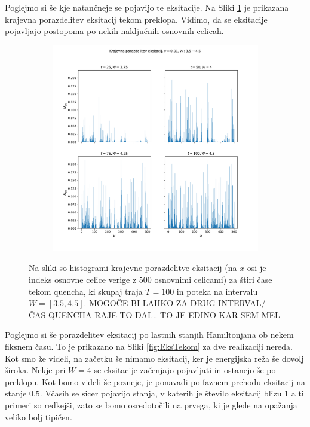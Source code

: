Poglejmo si še kje natančneje se pojavijo te eksitacije. Na Sliki \ref{fig:Krajevne} je prikazana krajevna porazdelitev eksitacij tekom preklopa. Vidimo, da se eksitacije pojavljajo postopoma po nekih naključnih osnovnih celicah.
\begin{figure}[H]
\centering
\begin{subfigure}{.99\textwidth}
\includegraphics[width=\linewidth]{Figures/KrajevneEksitacije.pdf}
\end{subfigure}
\caption{Na sliki so histogrami krajevne porazdelitve eksitacij (na $x$ osi je indeks osnovne celice verige z 500 osnovnimi celicami) za štiri čase tekom quencha, ki skupaj traja $T=100$ in poteka na intervalu $W=[3.5,4.5]$. MOGOČE BI LAHKO ZA DRUG INTERVAL/ČAS QUENCHA RAJE TO DAL.. TO JE EDINO KAR SEM MEL}
\label{fig:Krajevne}
\end{figure}

Poglejmo si še porazdelitev eksitacij po lastnih stanjih Hamiltonjana ob nekem fiksnem času. To je prikazano na Sliki \ref{fig:EksTekom} za dve realizaciji nereda. Kot smo že videli, na začetku še nimamo eksitacij, ker je energijska reža še dovolj široka. Nekje pri $W=4$ se eksitacije začenjajo pojavljati in ostanejo še po preklopu. 
Kot bomo videli še pozneje, je ponavadi po faznem prehodu eksitacij na stanje $0.5$. Včasih se sicer pojavijo stanja, v katerih je število eksitacij blizu $1$ a ti primeri so redkejši, zato se bomo osredotočili na prvega, ki je glede na opažanja veliko bolj tipičen.

